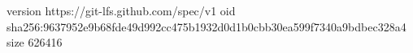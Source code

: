 version https://git-lfs.github.com/spec/v1
oid sha256:9637952e9b68fde49d992cc475b1932d0d1b0cbb30ea599f7340a9bdbec328a4
size 626416
